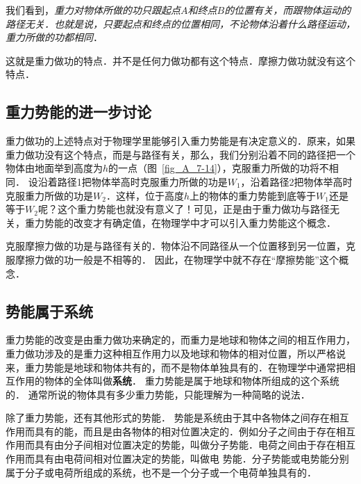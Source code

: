 我们看到，\textit{重力对物体所做的功只跟起点$A$和终点$B$的位置有关，而跟物体运动的路径无关．也就是说，只要起点和终点的位置相同，不论物体沿着什么路径运动，重力所做的功都相同}．

这就是重力做功的特点．并不是任何力做功都有这个特点．摩擦力做功就没有这个特点．

\subsection{重力势能的进一步讨论}



重力做功的上述特点对于物理学里能够引入重力势能是有决定意义的．原来，如果重力做功没有这个特点，而是与路径有关，那么，我们分别沿着不同的路径把一个物体由地面举到高度为$h$的一点（图~\ref{fig_A_7-14}），克服重力所做的功将不相同．
设沿着路径1把物体举高时克服重力所做的功是$W_1$，沿着路径2把物体举高时克服重力所做的功是$W_2$．这样，位于高度$h$上的物体的重力势能到底等于$W_1$还是等于$W_2$呢？这个重力势能也就没有意义了！可见，正是由于重力做功与路径无关，重力势能的改变才有确定值，在物理学中才可以引入重力势能这个概念．


克服摩擦力做的功是与路径有关的．物体沿不同路径从一个位置移到另一位置，克服摩擦力做的功一般是不相等的．
因此，在物理学中就不存在“摩擦势能”这个概念．


\subsection{势能属于系统} 

重力势能的改变是由重力做功来确定的，而重力是地球和物体之间的相互作用力，重力做功涉及的是重力这种相互作用力以及地球和物体的相对位置，所以严格说来，重力势能是地球和物体共有的，而不是物体单独具有的．在物理学中通常把相互作用的物体的全体叫做\textbf{系统}．
重力势能是属于地球和物体所组成的这个系统的．
通常所说的物体具有多少重力势能，只能理解为一种简略的说法．

除了重力势能，还有其他形式的势能．
势能是系统由于其中各物体之间存在相互作用而具有的能，而且是由各物体的相对位置决定的．例如分子之间由于存在相互作用而具有由分子间相对位置决定的势能，叫做分子势能．电荷之间由于存在相互作用而具有由电荷间相对位置决定的势能，叫做电
势能．分子势能或电势能分别属于分子或电荷所组成的系统，也不是一个分子或一个电荷单独具有的．

